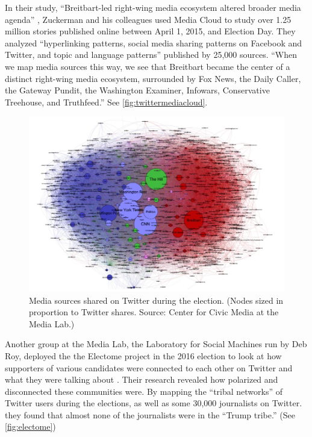 In their study, ``Breitbart-led right-wing media ecosystem altered broader media agenda'' \cite{benkler2017study}, Zuckerman and his colleagues used Media Cloud to study over 1.25 million stories published online between April 1, 2015, and Election Day. They analyzed ``hyperlinking patterns, social media sharing patterns on Facebook and Twitter, and topic and language patterns'' published by 25,000 sources. ``When we map media sources this way, we see that Breitbart became the center of a distinct right-wing media ecosystem, surrounded by Fox News, the Daily Caller, the Gateway Pundit, the Washington Examiner, Infowars, Conservative Treehouse, and Truthfeed.'' See \autoref{fig:twittermediacloud}.

\begin{figure}[h]
 \centering
 \includegraphics[width=1\textwidth]{pictures/Twitter-Image-1}
 \caption[Media sources shared on Twitter during the election]{Media sources shared on Twitter during the election. (Nodes sized in proportion to Twitter shares. Source: Center for Civic Media at the Media Lab.)}
 \label{fig:twittermediacloud}
\end{figure}

Another group at the Media Lab, the Laboratory for Social Machines run by Deb Roy, deployed the the Electome project \cite{Enterthe97:online} in the 2016 election to look at how supporters of various candidates were connected to each other on Twitter and what they were talking about \cite{electome:online}. Their research revealed how polarized and disconnected these communities were. By mapping the ``tribal networks'' of Twitter users during the elections, as well as some 30,000 journalists on Twitter. they found that almost none of the journalists were in the ``Trump tribe.'' (See \autoref{fig:electome})

